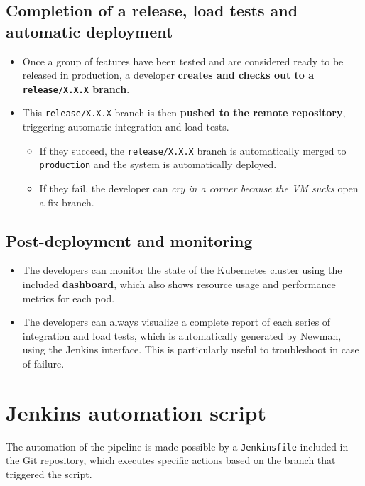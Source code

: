 \subsection{Completion of a release, load tests and automatic deployment}

\begin{itemize}
    \item Once a group of features have been tested and are considered ready to be released in production, a developer \textbf{creates and checks out to a \texttt{release/X.X.X} branch}.
    \item This \texttt{release/X.X.X} branch is then \textbf{pushed to the remote repository}, triggering automatic integration and load tests. 
    \begin{itemize}
        \item If they succeed, the \texttt{release/X.X.X} branch is automatically merged to \texttt{production} and the system is automatically deployed.
        \item If they fail, the developer can \textit{cry in a corner because the VM sucks} open a fix branch.
    \end{itemize}
\end{itemize}    

\subsection{Post-deployment and monitoring}
\begin{itemize}
    \item The developers can monitor the state of the Kubernetes cluster using the included \textbf{dashboard}, which also shows resource usage and performance metrics for each pod.
    \item The developers can always visualize a complete report of each series of integration and load tests, which is automatically generated by Newman, using the Jenkins interface. This is particularly useful to troubleshoot in case of failure.
\end{itemize}

\section{Jenkins automation script}

The automation of the pipeline is made possible by a \texttt{Jenkinsfile} included in the Git repository, which executes specific actions based on the branch that triggered the script.

